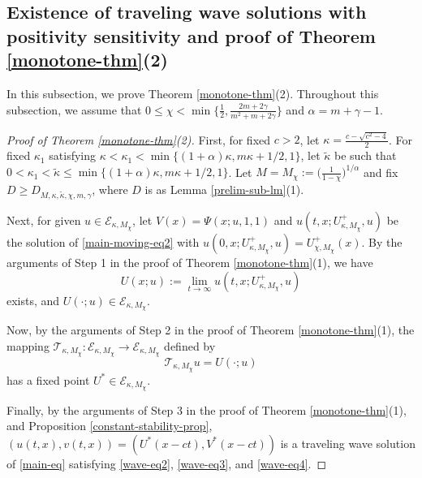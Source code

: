 \documentclass[11pt]{article} %
\theoremstyle{remark}
\theoremstyle{remark}
\numberwithin{equation}{section}
\numberwithin{figure}{section}
\numberwithin{table}{section}
\begin{document}
\subsection{Existence of  traveling wave solutions with positivity sensitivity and proof of Theorem \ref{monotone-thm}(2)}


In this subsection, we prove Theorem \ref{monotone-thm}(2). Throughout this subsection, we assume that 
$0\le \chi<\min\{\frac{1}{2},\frac{2m+2\gamma}{m^2+m+2\gamma}\}$ and $\alpha=m+\gamma-1$.

\begin{proof}[Proof of Theorem \ref{monotone-thm}(2)]
First, for fixed   $c> 2$,  let  $\kappa=\frac{c-\sqrt{c^2-4}}{2}$. For fixed
$\kappa_1$ satisfying $\kappa<\kappa_1<   \min\{(1+\alpha)\kappa, m\kappa+1/2,  1\}$,   let $\tilde \kappa$ be such that
  $0<\kappa_1<\tilde \kappa \le \min\{(1+\alpha)\kappa, m\kappa+1/2, 1\}$. 
Let $M=M_{\chi}:=\big(\frac{1}{1-\chi}\big)^{1/\alpha}$ and  fix  $D\ge D_{M,\kappa,\tilde\kappa,\chi,m,\gamma}$, where $D$ is as Lemma \ref{prelim-sub-lm}(1).


Next, for given $u\in\mathcal{E}_{\kappa,M_{\chi}}$, let $V(x)=\Psi(x;u,1,1)$ and 
$u(t,x;U_{\kappa,M_{\chi}}^+,u)$ be the solution 
of \eqref{main-moving-eq2} with $u(0,x;U_{\kappa,M_\chi}^+,u)=U_{\chi,M_{\chi}}^+(x)$. By the arguments of Step 1 in the proof of Theorem \ref{monotone-thm}(1), we have
$$
U(x;u):=\lim_{t\to\infty} u(t,x;U_{\kappa,M_{\chi}}^+,u)
$$
exists, and $U(\cdot;u)\in\mathcal{E}_{\kappa,M_{\chi}}$.



Now, by the arguments of Step 2 in the proof of Theorem \ref{monotone-thm}(1),  the mapping $\mathcal{T}_{\kappa,M_{\chi}}:\mathcal{E}_{\kappa,M_{\chi}}\to \mathcal{E}_{\kappa,M_{\chi}}$  defined by 
$$
\mathcal{T}_{\kappa,M_{\chi}} u=U(\cdot;u)
$$
 has a fixed point $U^*\in\mathcal{E}_{\kappa,M_{\chi}}$.


Finally, by the   arguments of Step 3 in the proof of Theorem \ref{monotone-thm}(1),  and  Proposition
\ref{constant-stability-prop},  $(u(t,x),v(t,x))=(U^*(x-ct),V^*(x-ct))$ is a traveling wave solution of \eqref{main-eq} satisfying \eqref{wave-eq2}, \eqref{wave-eq3}, and \eqref{wave-eq4}. 
\end{proof}
\end{document}
